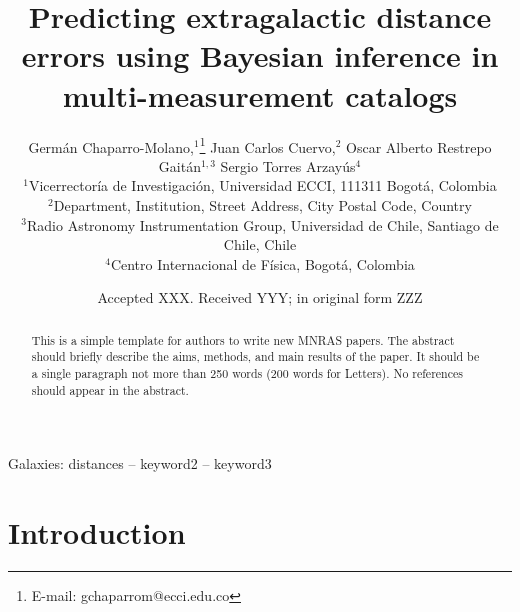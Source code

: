\documentclass[a4paper,fleqn,usenatbib]{mnras}
\title[Predicting extragalactic distance errors]{Predicting extragalactic distance errors using Bayesian inference in multi-measurement catalogs}
\author[G. Chaparro-Molano et al.]{Germ\'an Chaparro-Molano,$^{1}$\thanks{E-mail: gchaparrom@ecci.edu.co}
Juan Carlos Cuervo,$^{2}$
Oscar Alberto Restrepo Gait\'an$^{1,3}$ \newauthor
Sergio Torres Arzay\'{u}s$^{4}$
\\
$^{1}$Vicerrector\'ia de Investigaci\'on, Universidad ECCI, 111311 Bogot\'a, Colombia\\
$^{2}$Department, Institution, Street Address, City Postal Code, Country\\
$^{3}$Radio Astronomy Instrumentation Group, Universidad de Chile, Santiago de Chile, Chile\\
$^{4}$Centro Internacional de F\'isica, Bogot\'a, Colombia
}
\date{Accepted XXX. Received YYY; in original form ZZZ}
\begin{document}
\label{firstpage}
\pagerange{\pageref{firstpage}--\pageref{lastpage}}
\maketitle

\begin{abstract}
This is a simple template for authors to write new MNRAS papers.
The abstract should briefly describe the aims, methods, and main results of the paper.
It should be a single paragraph not more than 250 words (200 words for Letters).
No references should appear in the abstract.
\end{abstract}

\begin{keywords}
Galaxies: distances -- keyword2 -- keyword3
\end{keywords}



\section{Introduction}
\end{document}
